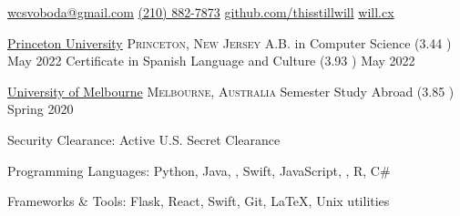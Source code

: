 \documentclass[10pt,letterpaper]{article}
\begin{document}
\sloppy


\nobreakvspace{0.3em}

\noindent\href{mailto:wcsvoboda.at.gmail.dot.com}{wcsvoboda\mbox{}@\mbox{}gmail.com}\sbull
\href{tel:2108827873}{(210) 882-7873}\sbull
\href{https://github.com/thisstillwill}{github.com/thisstillwill}\sbull
\href{https://will.cx}{will.cx}

\spacedhrule{0.9em}{-0.4em}


\headedsection
  {\href{https://www.princeton.edu/}{Princeton University}}
  {\textsc{Princeton, New Jersey}} {%
  \headedsubsection
    {A.B. in Computer Science \textnormal{(3.44 )}}
    {May 2022}
    {}
  \headedsubsection
    {Certificate in Spanish Language and Culture \textnormal{(3.93 )}}
    {May 2022}{}
}

\headedsection
  {\href{https://www.unimelb.edu.au/}{University of Melbourne}}
  {\textsc{Melbourne, Australia}} {%
  \headedsubsection
    {Semester Study Abroad \textnormal{(3.85 )}}
    {Spring 2020}{}
}

\spacedhrule{0.5em}{-0.4em}


\inlineheadsection
  {Security Clearance:}
  {Active U.S. Secret Clearance}

\inlineheadsection
  {Programming Languages:}
  {Python, Java, , Swift, JavaScript, , R, C\#}

\inlineheadsection
  {Frameworks \& Tools:}
  {Flask, React, Swift, Git, \LaTeX, Unix utilities}

\end{document}
